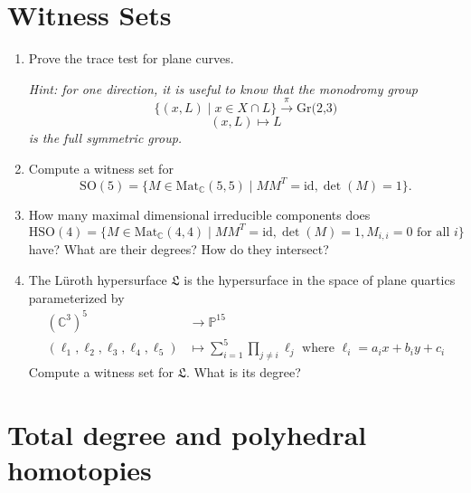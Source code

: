 \documentclass[11pt,reqno]{amsart}
\theoremstyle{definition}
\theoremstyle{remark}
\numberwithin{equation}{section}
\begin{document}
\section{Witness Sets}
\begin{enumerate}
\item Prove the trace test for plane curves.

\textit{Hint: for one direction, it is useful to know that the monodromy group $$\{(x,L) \mid x \in X \cap L\} \xrightarrow{\pi} \textrm{Gr(2,3)}$$ $$(x,L) \mapsto L$$ is the full symmetric group.}

\item Compute a witness set for $$\text{SO}(5) = \{M \in \text{Mat}_{\mathbb{C}}(5,5) \mid M M^T = \textrm{id}, \det(M) = 1\}.$$

\item How many maximal dimensional irreducible components does
$$\text{HSO}(4) = \{M \in \text{Mat}_{\mathbb{C}}(4,4) \mid MM^T= \textrm{id}, \det(M) = 1, M_{i,i}=0 \text{ for all }i\}$$
have? What are their degrees? How do they intersect?

\item The L\"uroth hypersurface $\mathfrak{L}$ is the hypersurface in the space of plane quartics parameterized by
\begin{align*}
(\mathbb{C}^3)^5 &\to \mathbb{P}^{15}\\
(\ell_1,\ell_2,\ell_3,\ell_4,\ell_5) &\mapsto \sum_{i=1}^5 \prod_{j \neq i} \ell_j \text{ where } \ell_i = a_ix+b_iy+c_i
\end{align*}
Compute a witness set for $\mathfrak{L}$. What is its degree?


\end{enumerate}


\section{Total degree and polyhedral homotopies}
\end{document}
